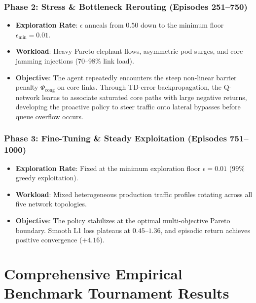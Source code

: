 \documentclass[12pt,a4paper,oneside]{report}
\begin{document}
\subsection{Phase 2: Stress \& Bottleneck Rerouting (Episodes 251--750)}
\begin{itemize}
    \item \textbf{Exploration Rate}: $\epsilon$ anneals from $0.50$ down to the minimum floor $\epsilon_{\text{min}} = 0.01$.
    \item \textbf{Workload}: Heavy Pareto elephant flows, asymmetric pod surges, and core jamming injections (70--98\% link load).
    \item \textbf{Objective}: The agent repeatedly encounters the steep non-linear barrier penalty $\Phi_{\text{cong}}$ on core links. Through TD-error backpropagation, the Q-network learns to associate saturated core paths with large negative returns, developing the proactive policy to steer traffic onto lateral bypasses before queue overflow occurs.
\end{itemize}

\subsection{Phase 3: Fine-Tuning \& Steady Exploitation (Episodes 751--1000)}
\begin{itemize}
    \item \textbf{Exploration Rate}: Fixed at the minimum exploration floor $\epsilon = 0.01$ ($99\%$ greedy exploitation).
    \item \textbf{Workload}: Mixed heterogeneous production traffic profiles rotating across all five network topologies.
    \item \textbf{Objective}: The policy stabilizes at the optimal multi-objective Pareto boundary. Smooth L1 loss plateaus at $0.45$--$1.36$, and episodic return achieves positive convergence ($+4.16$).
\end{itemize}


\chapter{Comprehensive Empirical Benchmark Tournament Results}
\label{chap:results}
\end{document}

